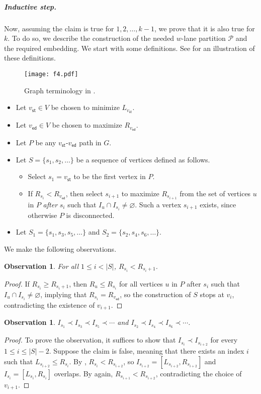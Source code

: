 \documentclass[11pt]{article}
\newtheorem{observation}[lemma]{Observation}
\theoremstyle{definition}
\theoremstyle{remark}
\renewcommand{\emptyset}{\varnothing}
\newcommand{\vst}{v_{\mathsf{st}}}
\newcommand{\ved}{v_{\mathsf{ed}}}
\begin{document}
\subparagraph{Inductive step.} Now, assuming the claim is true for $1, 2, \ldots, k-1$, we prove that it is also true for $k$. To do so, we describe the construction of the needed $w$-lane partition $\mathcal{P}$ and the required embedding.  We start with some definitions. See  for an illustration of these definitions.

\begin{figure}[ht!]
    \centering
    \texttt{[image: f4.pdf]}
    \caption{Graph terminology in .}
    \label{fig:f4}
\end{figure}

\begin{itemize}
    \item Let $\vst \in V$ be chosen to minimize  $L_{\vst}$.
\item Let $\ved \in V$ be chosen to maximize $R_{\ved}$.
\item Let $P$ be any $\vst$-$\ved$ path in $G$. 
\item Let $S=\{s_1, s_2, \ldots\}$ be a sequence of vertices defined as follows.
\begin{itemize}
    \item Select $s_1 = \vst$ to be the first vertex in $P$. 
    \item If $R_{s_i} < R_{\ved}$, then select $s_{i+1}$ to maximize $R_{s_{i+1}}$ from the set of vertices $u$ in $P$ \emph{after} $s_i$ such that $I_u \cap I_{s_{i}} \neq \emptyset$. Such a vertex $s_{i+1}$ exists, since otherwise $P$ is disconnected.
\end{itemize}
\item Let $S_1 = \{s_1, s_3, s_5, \ldots\}$ and $S_2 = \{s_2, s_4, s_6, \ldots\}$.
\end{itemize}

We make the following observations.

\begin{observation}\label{obs0}
For all $1 \leq i < |S|$, $R_{s_i} < R_{s_i+1}$.
\end{observation}
\begin{proof}
If $R_{s_i} \geq R_{s_i+1}$, then $R_{u} \leq R_{s_i}$ for all vertices $u$ in $P$ {after} $s_i$ such that $I_u \cap I_{s_{i}} \neq \emptyset$, implying that $R_{s_i} = R_{\ved}$, so the construction of $S$ stops at $v_i$, contradicting the existence of $v_{i+1}$.
\end{proof}


\begin{observation}\label{obs1}
$I_{s_1} \prec I_{s_3} \prec I_{s_5} \prec \cdots$ and $I_{s_2} \prec I_{s_4} \prec I_{s_6} \prec \cdots$.
\end{observation}
\begin{proof}
To prove the observation, it suffices to show that $I_{s_i} \prec I_{s_{i+2}}$ for every $1 \leq i \leq |S|-2$. Suppose the claim is false, meaning that there exists an index $i$ such that $L_{s_{i+2}} \leq R_{s_i}$. By , $R_{s_i} < R_{s_{i+2}}$, so $I_{s_{i+2}}=[L_{s_{i+2}}, R_{s_{i+2}}]$ and $I_{s_{i}}=[L_{s_{i}}, R_{s_{i}}]$ overlaps. By  again, $R_{s_{i+1}} < R_{s_{i+2}}$, contradicting the choice of $v_{i+1}$.
\end{proof}
\end{document}
